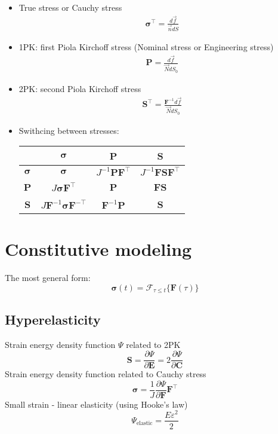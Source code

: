 \documentclass[../main.tex]{subfiles}
\begin{document}
\begin{itemize}
    \item True stress or Cauchy stress
    \begin{align}
        \bm{\sigma}^{\top} = \frac{d\vec{f}}{\vec{n}dS}
    \end{align}
    \item 1PK: first Piola Kirchoff stress (Nominal stress or Engineering stress)
    \begin{align}
        \textbf{P} = \frac{d\vec{f}}{\vec{N}dS_0}
    \end{align}
    \item 2PK: second Piola Kirchoff stress
    \begin{align}
        \textbf{S}^{\top} = \frac{\textbf{F}^{-1}d\vec{f}}{\vec{N}dS_0}
    \end{align}
    \item Swithcing between stresses:
    \begingroup
        \renewcommand{\arraystretch}{1.5}
        \begin{tabular}{c|ccc}
             & $\bm{\sigma}$ & \textbf{P} & \textbf{S} \\
            \hline
            $\bm{\sigma}$ & $\bm{\sigma}$ & $J^{-1}\textbf{P}\textbf{F}^{\top}$ & $J^{-1}\textbf{F}\textbf{S}\textbf{F}^{\top}$\\
            \textbf{P} & $J\bm{\sigma}\textbf{F}^{\top}$ & \textbf{P} & \textbf{F}\textbf{S}\\
            \textbf{S} & $J\textbf{F}^{-1}\bm{\sigma}\textbf{F}^{-\top}$ & $\textbf{F}^{-1}\textbf{P}$ & \textbf{S} \\
        \end{tabular}
    \endgroup
\end{itemize}

\section{Constitutive modeling}

The most general form:
\begin{equation}
    \bm{\sigma}(t) = \mathcal{F}_{\tau \leq t}\{\textbf{F}(\tau)\}
\end{equation}

\subsection{Hyperelasticity}

Strain energy density function $\Psi$ related to 2PK
\begin{equation} 
    \textbf{S} = \frac{\partial \Psi}{\partial \textbf{E}} = 2\frac{\partial \Psi}{\partial \textbf{C}}
\end{equation}
Strain energy density function related to Cauchy stress
\begin{equation}
    \bm{\sigma} = \frac{1}{J}\frac{\partial \Psi}{\partial \textbf{F}}\textbf{F}^{\top}
\end{equation}
Small strain - linear elasticity (using Hooke's law)
\begin{equation}
    \Psi_{\text{elastic}} = \frac{E\varepsilon^2}{2}
\end{equation}
\end{document}
